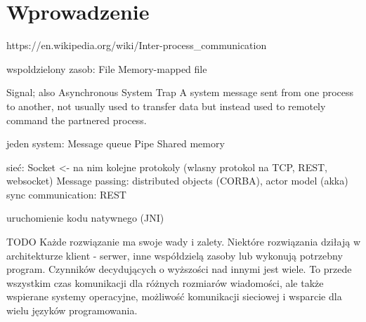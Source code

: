 \chapter{Wprowadzenie}


https://en.wikipedia.org/wiki/Inter-process\_communication

wspoldzielony zasob:
File
Memory-mapped file

Signal; also Asynchronous System Trap	A system message sent from one process to another, not usually used to transfer data but instead used to remotely command the partnered process.




jeden system:
Message queue
Pipe
Shared memory


sieć:
Socket <- na nim kolejne protokoly (wlasny protokol na TCP, REST, websocket)
Message passing: distributed objects (CORBA), actor model (akka)
sync communication: REST


uruchomienie kodu natywnego (JNI)




TODO
Każde rozwiązanie ma swoje wady i zalety. Niektóre rozwiązania dziłają w architekturze klient - serwer, inne współdzielą zasoby lub wykonują potrzebny program. Czynników decydujących o wyższości nad innymi jest wiele. To przede wszystkim czas komunikacji dla różnych rozmiarów wiadomości, ale także wspierane systemy operacyjne, możliwość komunikacji sieciowej i wsparcie dla wielu języków programowania.
